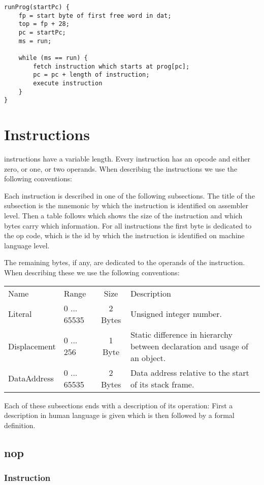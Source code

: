 \begin{lstlisting}
runProg(startPc) {
	fp = start byte of first free word in dat;
	top = fp + 28;
	pc = startPc;
	ms = run;
	
	while (ms == run) {
		fetch instruction which starts at prog[pc];
		pc = pc + length of instruction;
		execute instruction
	}
}
\end{lstlisting}

\section{Instructions}\label{sec:instructions}
\leongage{} instructions have a variable length. Every instruction has an opcode and either zero, or one, or two operands. When describing the instructions we use the following conventions:

Each instruction is described in one of the following subsections. The title of the subsection is the mnemonic by which the instruction is identified on assembler level. Then a table follows which shows the size of the instruction and which bytes carry which information. For all instructions the first byte is dedicated to the op code, which is the id by which the instruction is identified on machine language level.

The remaining bytes, if any, are dedicated to the operands of the instruction. When describing these we use the following conventions:

\begin{tabular}{llcp{18.8em}}
Name & Range & Size & Description \\
Literal & 0 ... 65535 & 2 Bytes & Unsigned integer number. \\
Displacement & 0 ... 256 & 1 Byte & Static difference in hierarchy between declaration and usage of an object. \\
DataAddress & 0 ... 65535 & 2 Bytes & Data address relative to the start of its stack frame.
\end{tabular}

Each of these subsections ends with a description of its operation: First a description in human language is given which is then followed by a formal definition.

\subsection{nop}
\subsubsection{Instruction}

